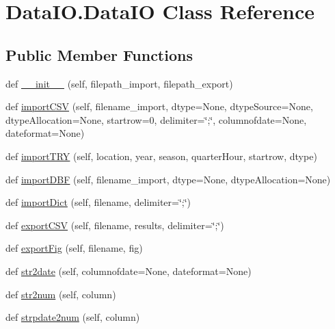 \hypertarget{class_data_i_o_1_1_data_i_o}{}\section{Data\+I\+O.\+Data\+IO Class Reference}
\label{class_data_i_o_1_1_data_i_o}
\subsection*{Public Member Functions}
\begin{DoxyCompactItemize}
\item 
def \hyperlink{class_data_i_o_1_1_data_i_o_a98bdded980e8bfc4ddaa1cd12a8392fe}{\+\_\+\+\_\+init\+\_\+\+\_\+} (self, filepath\+\_\+import, filepath\+\_\+export)
\item 
def \hyperlink{class_data_i_o_1_1_data_i_o_aa79466ed985916b447e97c1b501ff30c}{import\+C\+SV} (self, filename\+\_\+import, dtype=None, dtype\+Source=None, dtype\+Allocation=None, startrow=0, delimiter=\char`\"{};\char`\"{}, columnofdate=None, dateformat=None)
\item 
def \hyperlink{class_data_i_o_1_1_data_i_o_a232251f90f75e5e8e307a035f191d1c4}{import\+T\+RY} (self, location, year, season, quarter\+Hour, startrow, dtype)
\item 
def \hyperlink{class_data_i_o_1_1_data_i_o_a6c56e9c0444c5bfd36093fcd966053b0}{import\+D\+BF} (self, filename\+\_\+import, dtype=None, dtype\+Allocation=None)
\item 
def \hyperlink{class_data_i_o_1_1_data_i_o_a57bc5372c9aa1d722c0d8e0cf1b749dd}{import\+Dict} (self, filename, delimiter=\char`\"{};\char`\"{})
\item 
def \hyperlink{class_data_i_o_1_1_data_i_o_a945b9f613d7eb68756a1483c8d8d7419}{export\+C\+SV} (self, filename, results, delimiter=\char`\"{};\char`\"{})
\item 
def \hyperlink{class_data_i_o_1_1_data_i_o_a4929b9de8bce15ad8e1fc432eb5167f9}{export\+Fig} (self, filename, fig)
\item 
def \hyperlink{class_data_i_o_1_1_data_i_o_a59071592ed63d8d505677035fd5ebda1}{str2date} (self, columnofdate=None, dateformat=None)
\item 
def \hyperlink{class_data_i_o_1_1_data_i_o_ae42c01ae3b0f343c292cb199327106f5}{str2num} (self, column)
\item 
def \hyperlink{class_data_i_o_1_1_data_i_o_a14e038023e1dd43e8c0a18842b4b73fb}{strpdate2num} (self, column)
\end{DoxyCompactItemize}


